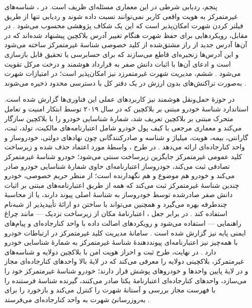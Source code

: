 پنجم، ردیابی شرطی در این معماری مسئله‌ای ظریف است. در ، شناسه‌های غیرمتمرکز به هویت واقعی کاربر نمی‌توانند نسبت داده شوند و ردیابی تنها از طریق فیلتر کردن شهرت امکان‌پذیر است که این یک شکاف پژوهشی محسوب می‌شود \cite{feraudoDIVADIDbasedReputation2024}. در مقابل، رویکردهایی برای حفظ شهرت هنگام تغییر آدرس بلاکچین پیشنهاد شده‌اند که در آن‌ها آدرس جدید از راز مشتق‌شده از کلید خصوصی شناسهٔ غیرمتمرکز ساخته می‌شود و این آدرس‌ها زنجیره‌ای قاطع می‌سازند که برای حسابرسی یا تحقیق قابل بازسازی است و ادعای آن‌ها با اثبات دانش صفر به قرارداد هوشمند و درخت مرکل تقویت می‌شود \cite{mazzocca2025survey}. ششم، مدیریت شهرت غیرمتمرزد نیز امکان‌پذیر است؛ در  امتیازات شهرت به‌صورت تراکنش‌های بدون ارزش در یک دفتر کل با دسترسی محدود ذخیره می‌شوند \cite{feraudoDIVADIDbasedReputation2024}.

در حوزهٔ حمل‌ونقل هوشمند نیز کاربردهای عملی این فناوری‌ها گزارش شده است. استاندارد شناسهٔ خودرو  مبتنی بر بلاکچین که در سال ۲۰۱۹ توسط ابتکار امنیت و تعامل متحرک مبتنی بر بلاکچین  تعریف شد، شمارهٔ شناسایی خودرو را با بلاکچین سازگار می‌کند و معماری مرجعی با کیف پول خودرو شامل اعتبارنامه‌های مالکیت، تولد، ثبت، گارانتی، بیمه، هویت، میلیاژ و شناسه و صادرکنندگانی چون نهادهای دولتی، خودروساز و واحد کنارجاده‌ای ارائه می‌دهد \cite{mazzocca2025survey}. در طرح ، واسطهٔ مورد اعتماد حذف شده و زیرساخت کلید عمومی غیرمتمرکز جایگزین زیرساخت سنتی می‌شود؛ خودرو شناسهٔ غیرمتمرکز تصادفی ثبت می‌کند، خودروساز اعتبارنامه‌ای حاوی شمارهٔ شناسایی خودرو صادر می‌کند و خودرو هم موضوع و هم نگهدارنده است؛ از منظر حریم خصوصی، خودرو چندین شناسهٔ غیرمتمرکز ثبت می‌کند که همه از طریق اعتبارنامه‌های مبتنی بر اثبات دانش صفر صادرشده توسط خودروساز به شناسهٔ اصلی پیوند دارند، یا از محاسبهٔ چندطرفه بهره می‌گیرد و همچنین می‌تواند با ساختن دو ارائهٔ تأییدپذیر از شبه‌نام استفاده کند \cite{mazzocca2025survey}. در برابر جعل ، اعتبارنامهٔ مکان از زیرساخت نزدیک — مانند چراغ راهنمایی — استفاده می‌شود و رویکردهای اصالت داده با واحد کنارجاده‌ای و پیام‌های ایمنی پایه نیز گزارش شده است \cite{mazzocca2025survey}. سامانهٔ مدیریت کلید غیرمتمرکز در ارتباطات خودرو با همه‌چیز نیز اعتبارنامه‌ای پیونددهندهٔ شناسهٔ غیرمتمرکز به شمارهٔ شناسایی خودرو دارد \cite{mazzocca2025survey}. در نهایت، طرح ثبت و احراز هویت امن با بلاکچین دولایه و شناسه‌های غیرمتمرکز، بلاکچینی دولایه را معرفی می‌کند که در لایهٔ بالا واحدهای کنارجاده‌ای مجاز و در لایهٔ پایین واحدها و خودروهای پوشش قرار دارند؛ خودرو شناسهٔ غیرمتمرکز خود را می‌سازد، واحدهای کنارجاده‌ای اعتبارنامهٔ یکتا صادر می‌کنند، گیرنده شناسهٔ فرستنده را با فهرست مجاز بررسی و آستانهٔ شهرت را کنترل می‌کند و بازخورد را برای به‌روزرسانیٔ شهرت به واحد کنارجاده‌ای می‌فرستد \cite{mazzocca2025survey}.

